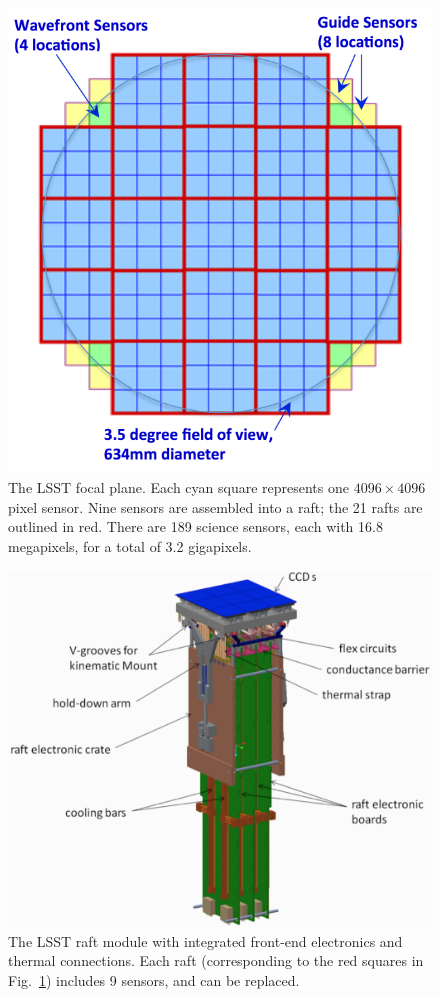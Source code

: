 \documentclass{emulateapj}
\begin{document}
\begin{figure}[ht]
\includegraphics[width=1.0\hsize,clip]{fov-updated-cropped.pdf}
\caption{The LSST focal plane. Each cyan square represents one
$4096\times4096$ pixel sensor. Nine sensors are assembled into a
raft; the 21 rafts are outlined in red. There are 189 science sensors, each 
with 16.8 megapixels, for a total of 3.2 gigapixels.} 
\label{Fig:fov}
\end{figure}

\begin{figure}[ht]
\includegraphics[width=1.\hsize,clip]{raft-updated-cropped.pdf}
\caption{The LSST raft module with integrated front-end electronics
and thermal connections. Each raft (corresponding to the red squares
in Fig.~\ref{Fig:fov}) 
includes 9 sensors, and can be replaced.} 
\label{Fig:raft}
\end{figure}
\end{document}

